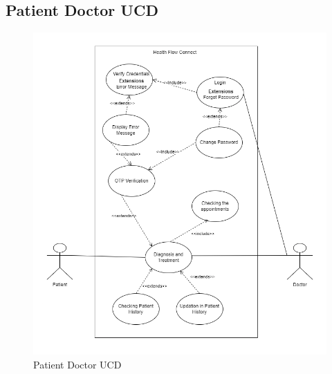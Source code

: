 \subsection{Patient Doctor UCD}
\begin{figure}[h!]
    \centering
    \includegraphics[width=1.1\textwidth]{Patient_Doctor_UCD.png}
    \caption{Patient Doctor UCD}
    \label{fig:patient_doctor_ucd}
\end{figure}
\clearpage
